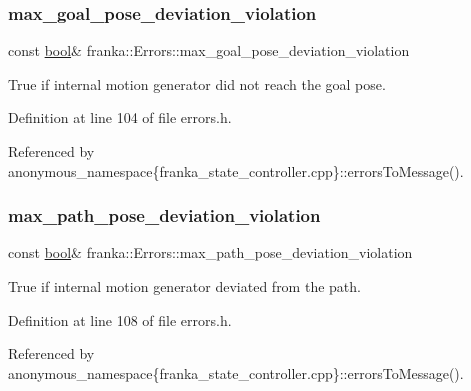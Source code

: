 \mbox{\label{structfranka_1_1Errors_ac55d3624087e606cb4ffab121869d580}} 
\subsubsection{\texorpdfstring{max\+\_\+goal\+\_\+pose\+\_\+deviation\+\_\+violation}{max\_goal\_pose\_deviation\_violation}}
{\footnotesize\ttfamily const \hyperlink{classbool}{bool}\& franka\+::\+Errors\+::max\+\_\+goal\+\_\+pose\+\_\+deviation\+\_\+violation}

True if internal motion generator did not reach the goal pose. 

Definition at line 104 of file errors.\+h.



Referenced by anonymous\+\_\+namespace\{franka\+\_\+state\+\_\+controller.\+cpp\}\+::errors\+To\+Message().

\mbox{\label{structfranka_1_1Errors_ad90cffe703ca1b782007f3ba49da587c}} 
\subsubsection{\texorpdfstring{max\+\_\+path\+\_\+pose\+\_\+deviation\+\_\+violation}{max\_path\_pose\_deviation\_violation}}
{\footnotesize\ttfamily const \hyperlink{classbool}{bool}\& franka\+::\+Errors\+::max\+\_\+path\+\_\+pose\+\_\+deviation\+\_\+violation}

True if internal motion generator deviated from the path. 

Definition at line 108 of file errors.\+h.



Referenced by anonymous\+\_\+namespace\{franka\+\_\+state\+\_\+controller.\+cpp\}\+::errors\+To\+Message().

